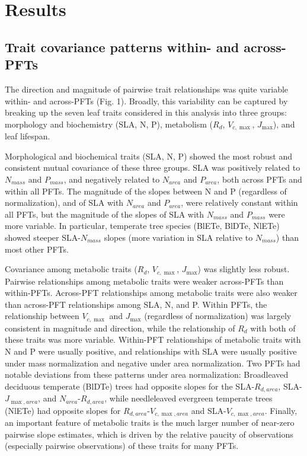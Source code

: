 \documentclass{article}
\begin{document}
\section{Results}

\subsection{Trait covariance patterns within- and across-PFTs}

The direction and magnitude of pairwise trait relationships was quite variable within- and across-PFTs (Fig. 1).
Broadly, this variability can be captured by breaking up the seven leaf traits considered in this analysis into three groups:
morphology and biochemistry (SLA, N, P),
metabolism ($R_d$, $V_{c,\max}$, $J_{\max}$),
and leaf lifespan.

Morphological and biochemical traits (SLA, N, P) showed the most robust and consistent mutual covariance of these three groups.
SLA was positively related to $N_{mass}$ and $P_{mass}$, and negatively related to $N_{area}$ and $P_{area}$, both across PFTs and within all PFTs.
The magnitude of the slopes between N and P (regardless of normalization), and of SLA with $N_{area}$ and $P_{area}$, were relatively constant within all PFTs,
but the magnitude of the slopes of SLA with $N_{mass}$ and $P_{mass}$ were more variable.
In particular, temperate tree species (BlETe, BlDTe, NlETe) showed steeper SLA-$N_{mass}$ slopes (more variation in SLA relative to $N_{mass}$) than most other PFTs.

Covariance among metabolic traits ($R_d$, $V_{c,\max}$, $J_{\max}$) was slightly less robust.
Pairwise relationships among metabolic traits were weaker across-PFTs than within-PFTs.
Across-PFT relationships among metabolic traits were also weaker than across-PFT relationships among SLA, N, and P.
Within PFTs, the relationship between $V_{c,\max}$ and $J_{\max}$ (regardless of normalization) was largely consistent in magnitude and direction,
while the relationship of $R_d$ with both of these traits was more variable.
Within-PFT relationships of metabolic traits with N and P were usually positive,
and relationships with SLA were usually positive under mass normalization and negative under area normalization.
Two PFTs had notable deviations from these patterns under area normalization:
Broadleaved deciduous temperate (BlDTe) trees had opposite slopes for the SLA-$R_{d,area}$, SLA-$J_{\max,area}$, and $N_{area}$-$R_{d,area}$,
while needleleaved evergreen temperate trees (NlETe) had opposite slopes for $R_{d,area}$-$V_{c,\max,area}$ and SLA-$V_{c,\max,area}$.
Finally, an important feature of metabolic traits is the much larger number of near-zero pairwise slope estimates,
which is driven by the relative paucity of observations (especially pairwise observations) of these traits for many PFTs.
\end{document}
